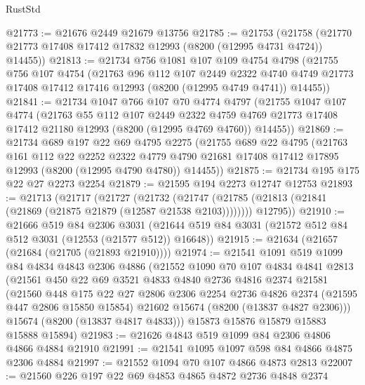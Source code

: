 \begin{lexlean}{RustStd}
\begin{coremodule}
@21773 := @21676 @2449 @21679 @13756
@21785 := @21753
    (@21758 (@21770 @21773 @17408 @17412 @17832 @12993 (@8200 (@12995 @4731 @4724)) @14455))
@21813 := @21734
    @756
    @1081
    @107
    @109
    @4754
    @4798
    (@21755
      @756
      @107
      @4754
      (@21763
        @96
        @112
        @107
        @2449
        @2322
        @4740
        @4749
        @21773
        @17408
        @17412
        @17416
        @12993
        (@8200 (@12995 @4749 @4741))
        @14455))
@21841 := @21734
    @1047
    @766
    @107
    @70
    @4774
    @4797
    (@21755
      @1047
      @107
      @4774
      (@21763
        @55
        @112
        @107
        @2449
        @2322
        @4759
        @4769
        @21773
        @17408
        @17412
        @21180
        @12993
        (@8200 (@12995 @4769 @4760))
        @14455))
@21869 := @21734
    @689
    @197
    @22
    @69
    @4795
    @2275
    (@21755
      @689
      @22
      @4795
      (@21763
        @161
        @112
        @22
        @2252
        @2322
        @4779
        @4790
        @21681
        @17408
        @17412
        @17895
        @12993
        (@8200 (@12995 @4790 @4780))
        @14455))
@21875 := @21734 @195 @175 @22 @27 @2273 @2254
@21879 := @21595 @194 @2273 @12747 @12753
@21893 := @21713
    (@21717
      (@21727
        (@21732 (@21747 (@21785 (@21813 (@21841 (@21869 (@21875 @21879 (@12587 @21538 @2103))))))))
        @12795))
@21910 := @21666
    @519
    @84
    @2306
    @3031
    (@21644 @519 @84 @3031 (@21572 @512 @84 @512 @3031 (@12553 (@21577 @512)) @16648))
@21915 := @21634 (@21657 (@21684 (@21705 (@21893 @21910))))
@21974 := @21541
    @1091
    @519
    @1099
    @84
    @4834
    @4843
    @2306
    @4886
    (@21552
      @1090
      @70
      @107
      @4834
      @4841
      @2813
      (@21561
        @450
        @22
        @69
        @3521
        @4833
        @4840
        @2736
        @4816
        @2374
        @21581
        (@21560
          @448
          @175
          @22
          @27
          @2806
          @2306
          @2254
          @2736
          @4826
          @2374
          (@21595 @447 @2806 @15850 @15854)
          @21602
          @15674
          (@8200 (@13837 @4827 @2306)))
        @15674
        (@8200 (@13837 @4817 @4833)))
      @15873
      @15876
      @15879
      @15883
      @15888
      @15894)
@21983 := @21626 @4843 @519 @1099 @84 @2306 @4806 @4866 @4884 @21910
@21991 := @21541 @1095 @1097 @598 @84 @4866 @4875 @2306 @4884
@21997 := @21552 @1094 @70 @107 @4866 @4873 @2813
@22007 := @21560 @226 @197 @22 @69 @4853 @4865 @4872 @2736 @4848 @2374

\end{coremodule}
\end{lexlean}
